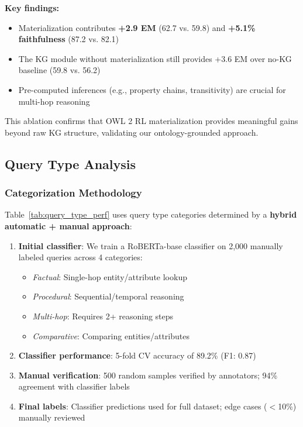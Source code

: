 \documentclass[10pt,twocolumn]{article}
\begin{document}
\textbf{Key findings:}
\begin{itemize}
    \item Materialization contributes \textbf{+2.9 EM} (62.7 vs. 59.8) and \textbf{+5.1\% faithfulness} (87.2 vs. 82.1)
    \item The KG module without materialization still provides +3.6 EM over no-KG baseline (59.8 vs. 56.2)
    \item Pre-computed inferences (e.g., property chains, transitivity) are crucial for multi-hop reasoning
\end{itemize}

This ablation confirms that OWL 2 RL materialization provides meaningful gains beyond raw KG structure, validating our ontology-grounded approach.


\subsection{Query Type Analysis}
\label{sec:query_types}

\subsubsection{Categorization Methodology}

Table~\ref{tab:query_type_perf} uses query type categories determined by a \textbf{hybrid automatic + manual approach}:

\begin{enumerate}
    \item \textbf{Initial classifier}: We train a RoBERTa-base classifier on 2,000 manually labeled queries across 4 categories:
    \begin{itemize}
        \item \textit{Factual}: Single-hop entity/attribute lookup
        \item \textit{Procedural}: Sequential/temporal reasoning
        \item \textit{Multi-hop}: Requires 2+ reasoning steps
        \item \textit{Comparative}: Comparing entities/attributes
    \end{itemize}
    
    \item \textbf{Classifier performance}: 5-fold CV accuracy of 89.2\% (F1: 0.87)
    
    \item \textbf{Manual verification}: 500 random samples verified by annotators; 94\% agreement with classifier labels
    
    \item \textbf{Final labels}: Classifier predictions used for full dataset; edge cases ($<$10\%) manually reviewed
\end{enumerate}
\end{document}
